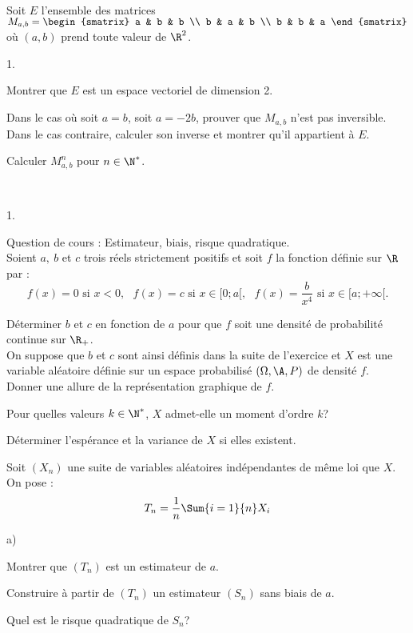 \documentclass[11pt]{article}%
\begin{document}
\begin{exerciceSP}~\\
  Soit $E$ l'ensemble des matrices $M_{a,b} = 
  \begin{smatrix} 
    a & b & b \\ 
    b & a & b \\ 
    b & b & a 
  \end{smatrix}$ où $(a,b)$ prend toute valeur de $\R^2$.
  \begin{noliste}{1.}
    \setlength{\itemsep}{2mm}
  \item Montrer que $E$ est un espace vectoriel de dimension 2.
  \item Dans le cas où soit $a = b$, soit $a = -2b$, prouver que
    $M_{a,b}$ n'est pas inversible. \\
    Dans le cas contraire, calculer son inverse et montrer qu'il
    appartient à $E$.
  \item Calculer $M_{a,b}^n$ pour $n \in \N^*$.
  \end{noliste}
\end{exerciceSP}


\newpage


\begin{exerciceAP}~
  \begin{noliste}{1.}
    \setlength{\itemsep}{2mm}
  \item Question de cours : Estimateur, biais, risque quadratique. \\[.2cm]
    Soient $a,\ b$ et $c$ trois réels strictement positifs et soit $f$
    la fonction définie sur $\R$ par :
    \[
    f(x) = 0 \text{ si } x < 0,\ \ \ f(x) = c \text{ si } x \in [ 0 ;
    a[,\ \ \ f(x) = \frac{b}{x^4} \text{ si } x \in [ a ; +\infty[.
    \]
  \item Déterminer $b$ et $c$ en fonction de $a$ pour que $f$ soit une
    densité de probabilité continue sur $\R_+$.\\
    On suppose que $b$ et $c$ sont ainsi définis dans la suite de
    l'exercice et $X$ est une variable aléatoire définie sur un espace
    probabilisé $(\Omega , \A , P)$ de densité $f$. \\ 
    Donner une allure de la représentation graphique de $f$.
  \item Pour quelles valeurs $k \in \N^*$, $X$ admet-elle un moment d'ordre $k$?
  \item Déterminer l'espérance et la variance de $X$ si elles existent.
  \item Soit $(X_n)$ une suite de variables aléatoires indépendantes
    de même loi que $X$. On pose :
    \[ 
    T_n = \frac{1}{n} \Sum{i=1}{n} X_i 
    \]
    \begin{noliste}{a)}
    \setlength{\itemsep}{2mm} 
    \item Montrer que $(T_n)$ est un estimateur de $a$.
    \item Construire à partir de $(T_n)$ un estimateur $(S_n)$ sans
      biais de $a$.
    \item Quel est le risque quadratique de $S_n$?
    \end{noliste}
  \end{noliste}
\end{exerciceAP}
\end{document}
